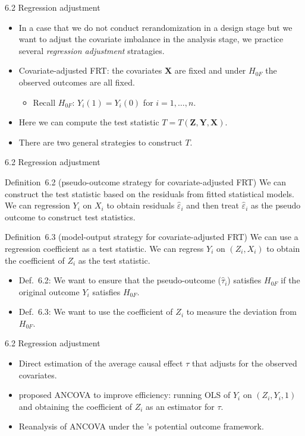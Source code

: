 \documentclass[aspectratio=169, 12pt]{beamer}
\begin{document}
\begin{frame}{6.2 Regression adjustment}
  \begin{itemize}
    \item In a case that we do not conduct rerandomization in a design stage but we want to adjust the covariate imbalance in the analysis stage, we practice several \textit{regression adjustment} stratagies.
    \item Covariate-adjusted FRT: the covariates $\bm{X}$ are fixed and under $H_{0F}$ the observed outcomes are all fixed.
    \begin{itemize}
      \item Recall $H_{0F}$: $Y_i(1)=Y_i(0)$ for $i=1,\dots,n$.
    \end{itemize}
    \item Here we can compute the test statistic $T = T(\bm{Z},\bm{Y},\bm{X})$.
    \item There are two general strategies to construct $T$.
  \end{itemize}
\end{frame}

\begin{frame}{6.2 Regression adjustment}
  \begin{keybox}{Definition~6.2 (pseudo-outcome strategy for covariate-adjusted FRT)}
    We can construct the test statistic based on the residuals from fitted statistical models. We can regression $Y_i$ on $X_i$ to obtain residuals $\widehat{\varepsilon}_i$ and then treat $\widehat{\varepsilon}_i$ as the pseudo outcome to construct test statistics.
  \end{keybox}
  \begin{keybox}{Definition~6.3 (model-output strategy for covariate-adjusted FRT)}
    We can use a regression coefficient as a test statistic. We can regress $Y_i$ on $(Z_i, X_i)$ to obtain the coefficient of $Z_i$ as the test statistic.
  \end{keybox}
  \begin{itemize}
    \item Def.~6.2: We want to ensure that the pseudo-outcome ($\widehat{\tau}_i$) satisfies $H_{0F}$ if the original outcome $Y_i$ satisfies $H_{0F}$.
    \item Def.~6.3: We want to use the coefficient of $Z_i$ to measure the deviation from $H_{0F}$.
  \end{itemize}
\end{frame}

\begin{frame}{6.2 Regression adjustment}
  \begin{itemize}
    \item Direct estimation of the average causal effect $\tau$ that adjusts for the observed covariates.
    \item \citet{fisher1934statistical} proposed ANCOVA to improve efficiency: running OLS of $Y_i$ on $(Z_i,Y_i,1)$ and obtaining the coefficient of $Z_i$ as an estimator for $\tau$.
    \item Reanalysis of ANCOVA under the \citet{neyman1923application}'s potential outcome framework.
  \end{itemize}
\end{frame}
\end{document}
